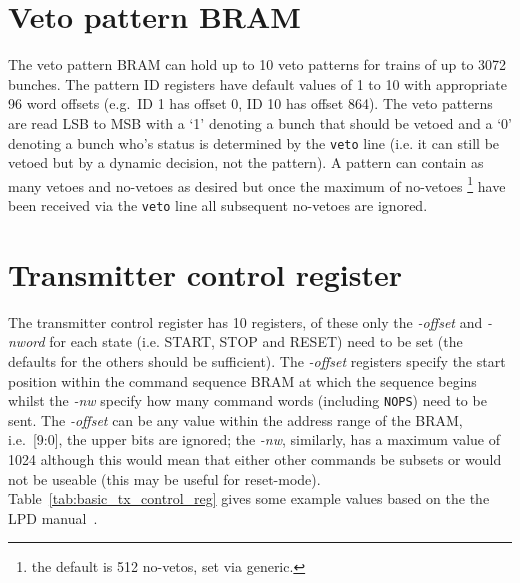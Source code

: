 \documentclass[]{report}
\begin{document}
    \section{Veto pattern BRAM} %
    \label{sub:basic_veto_pattern_bram}
    The veto pattern BRAM can hold up to 10 veto patterns for trains of up to 3072 bunches. The pattern ID registers have default values of 1 to 10 with appropriate 96 word offsets (e.g.\ ID 1 has offset 0, ID 10 has offset 864). The veto patterns are read LSB to MSB with a `1' denoting a bunch that should be vetoed and a `0' denoting a bunch who's status is determined by the \texttt{veto} line (i.e. it can still be vetoed but by a dynamic decision, not the pattern). A pattern can contain as many vetoes and no-vetoes as desired but once the maximum of no-vetoes \footnote{the default is 512 no-vetos, set via generic.} have been received via the \texttt{veto} line all subsequent no-vetoes are ignored.
    
    \section{Transmitter control register} %
    \label{sub:basic_transmitter_control_register}
    The transmitter control register has 10 registers, of these only the \emph{-offset} and \emph{-nword} for each state (i.e. START, STOP and RESET) need to be set (the defaults for the others should be sufficient). The \emph{-offset} registers specify the start position within the command sequence BRAM at which the sequence begins whilst the \emph{-nw} specify how many command words (including \texttt{NOPS}) need to be sent. The \emph{-offset} can be any value within the address range of the BRAM, i.e.\ [9:0], the upper bits are ignored; the \emph{-nw}, similarly, has a maximum value of 1024 although this would mean that either other commands be subsets or would not be useable (this may be useful for reset-mode). Table~\ref{tab:basic_tx_control_reg} gives some example values based on the the LPD manual~\cite{LPD MANUAL}.
    
\end{document}
